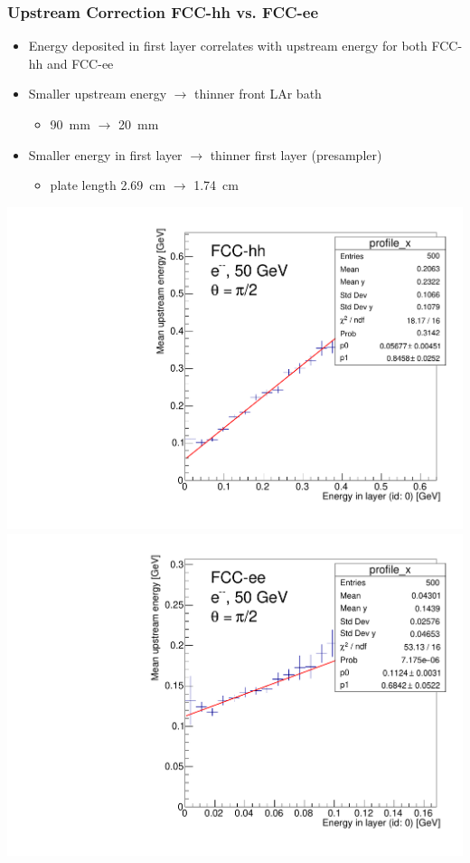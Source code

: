 \documentclass{beamer}
\begin{document}
\begin{frame}
  \frametitle{Upstream Correction FCC-hh vs. FCC-ee}

  \begin{itemize}
    \item Energy deposited in first layer correlates with upstream energy for
          both FCC-hh and FCC-ee
    \item Smaller upstream energy $\rightarrow$ thinner front LAr bath
          \begin{itemize}
            \item 90~mm $\rightarrow$ 20~mm
          \end{itemize}
    \item Smaller energy in first layer $\rightarrow$ thinner first layer
          (presampler)
          \begin{itemize}
            \item plate length 2.69~cm $\rightarrow$ 1.74~cm
          \end{itemize}
  \end{itemize}

  \includegraphics[width=0.49\linewidth]{figures/fcchh_profile_upstream_vs_first_layer_90deg_50GeV.pdf}
  \includegraphics[width=0.49\linewidth]{figures/fccee_profile_upstream_vs_first_layer_90deg_50GeV.pdf}
\end{frame}
\end{document}
